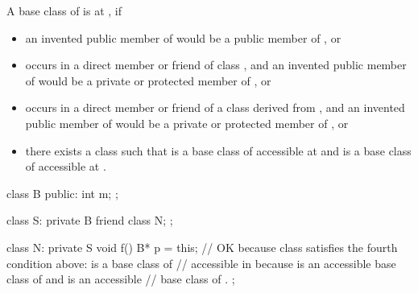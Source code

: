 \pnum
A base class
of
is
at
,
if
\begin{itemize}
\item
an invented public member of
would be a public member of
, or
\item
{}
occurs in a direct member or friend of class
,
and an invented public member of
would be a private or protected member of
, or
\item
{}
occurs in a direct member or friend of a class
derived from
,
and an invented public member of
would be a private or protected member of
, or
\item
there exists a class
such that
is a base class of
accessible at
and
is a base class of
accessible at
.
\end{itemize}

\begin{example}
\begin{codeblock}
class B {
public:
  int m;
};

class S: private B {
  friend class N;
};

class N: private S {
  void f() {
    B* p = this;    // OK because class  satisfies the fourth condition above:  is a base class of 
                    // accessible in  because  is an accessible base class of  and  is an accessible
                    // base class of .
  }
};
\end{codeblock}
\end{example}

